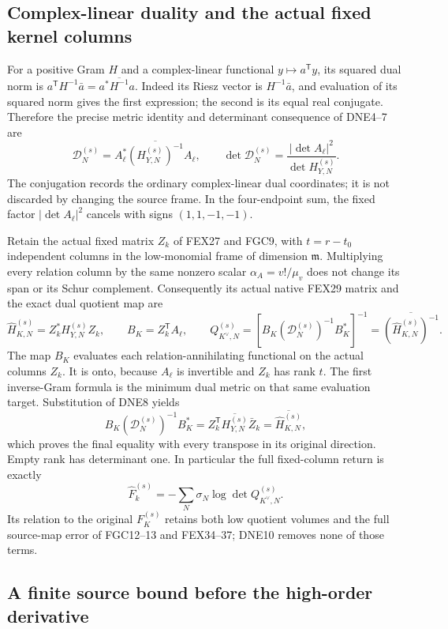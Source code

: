 \documentclass[11pt,a4paper]{article}
\begin{document}
\subsection{Complex-linear duality and the actual fixed kernel columns}

For a positive Gram $H$ and a complex-linear functional
$y\mapsto a^{\mathsf T}y$, its squared dual norm is
$a^{\mathsf T}H^{-1}\bar a
 =a^*\overline{H^{-1}}a$.
Indeed its Riesz vector is $H^{-1}\bar a$, and evaluation
of its squared norm gives the first expression; the second
is its equal real conjugate. Therefore the precise metric
identity and determinant consequence of DNE4--7 are
\[
 \mathcal D_N^{(s)}
   =A_\ell^*\overline{(H_{Y,N}^{(s)})^{-1}}A_\ell,\qquad
 \det\mathcal D_N^{(s)}
   =\frac{|\det A_\ell|^2}{\det H_{Y,N}^{(s)}}.
 \tag{DNE8}
\]
The conjugation records the ordinary complex-linear dual
coordinates; it is not discarded by changing the source frame.
In the four-endpoint sum, the fixed factor $|\det A_\ell|^2$
cancels with signs $(1,1,-1,-1)$.

Retain the actual fixed matrix $Z_k$ of FEX27 and FGC9,
with $t=r-t_0$ independent columns in the low-monomial
frame of dimension $\mathfrak m$. Multiplying every
relation column by the same nonzero scalar
$\alpha_A=v!/\mu_v$ does not change its span or its
Schur complement. Consequently its actual native
FEX29 matrix and the exact dual quotient map are
\[
 \widehat H_{K,N}^{(s)}=Z_k^*H_{Y,N}^{(s)}Z_k,\qquad
 B_K=Z_k^{\mathsf T}A_\ell,\qquad
 Q_{K^\vee,N}^{(s)}
 =\left[B_K(\mathcal D_N^{(s)})^{-1}B_K^*\right]^{-1}
 =\overline{(\widehat H_{K,N}^{(s)})^{-1}}.
 \tag{DNE9}
\]
The map $B_K$ evaluates each relation-annihilating functional
on the actual columns $Z_k$. It is onto, because $A_\ell$
is invertible and $Z_k$ has rank $t$. The first inverse-Gram
formula is the minimum dual metric on that same evaluation
target. Substitution of DNE8 yields
\[
 B_K(\mathcal D_N^{(s)})^{-1}B_K^*
 =Z_k^{\mathsf T}\overline{H_{Y,N}^{(s)}}\bar Z_k
 =\overline{\widehat H_{K,N}^{(s)}},
\]
which proves the final equality with every transpose in
its original direction. Empty rank has determinant one.
In particular the full fixed-column return is exactly
\[
 \widehat F_k^{(s)}
 =-\sum_N\sigma_N\log\det Q_{K^\vee,N}^{(s)}.
 \tag{DNE10}
\]
Its relation to the original $F_K^{(s)}$ retains both low
quotient volumes and the full source-map error of FGC12--13
and FEX34--37; DNE10 removes none of those terms.

\subsection{A finite source bound before the high-order derivative}
\end{document}

